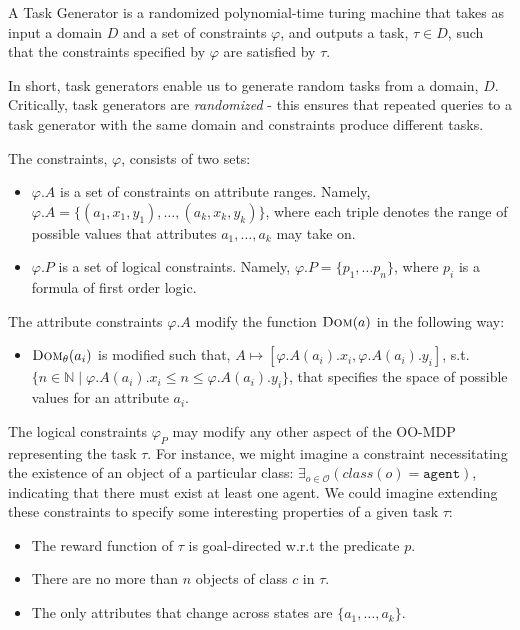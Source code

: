 \documentclass[11pt]{article}
\begin{document}
{ A \textup{Task Generator} is a randomized polynomial-time turing machine that takes as input a domain $D$ and a set of constraints $\varphi$, and outputs a task, $\tau \in D$, such that the constraints specified by $\varphi$ are satisfied by $\tau$.}

In short, task generators enable us to generate random tasks from a domain, $D$. Critically, task generators are {\it randomized} - this ensures that repeated queries to a task generator with the same domain and constraints produce different tasks.

The constraints, $\varphi$, consists of two sets:

\begin{itemize}
\item $\varphi.A$ is a set of constraints on attribute ranges. Namely, $\varphi.A = \{ (a_1, x_1, y_1), \ldots, (a_k, x_k, y_k) \}$, where each triple denotes the range of possible values that attributes $a_1, \ldots, a_k$ may take on.
\item $\varphi.P$ is a set of logical constraints. Namely, $\varphi.P = \{p_1, \ldots p_n\}$, where $p_i$ is a formula of first order logic.
\end{itemize}

The attribute constraints $\varphi.A$ modify the function $\textsc{Dom}(a)$ in the following way:

\begin{itemize}
\item $\textsc{Dom}_\theta(a_i)$ is modified such that, $A \mapsto [\varphi.A(a_i).x_i,\varphi.A(a_i).y_i]$, s.t. $\{n \in \mathbb{N} \mid \varphi.A(a_i).x_i \leq n \leq \varphi.A(a_i).y_i \}$, that specifies the space of possible values for an attribute $a_i$.
\end{itemize}

The logical constraints $\varphi_P$ may modify any other aspect of the OO-MDP representing the task $\tau$. For instance, we might imagine a constraint necessitating the existence of an object of a particular class: $\exists_{o \in \mathcal{O}} \left(class(o) = \texttt{agent}\right)$, indicating that there must exist at least one agent. We could imagine extending these constraints to specify some interesting properties of a given task $\tau$:

\begin{itemize}
\item The reward function of $\tau$ is goal-directed w.r.t the predicate $p$.
\item There are no more than $n$ objects of class $c$ in $\tau$.
\item The only attributes that change across states are $\{a_1, \ldots, a_k\}$.
\end{itemize}
\end{document}
